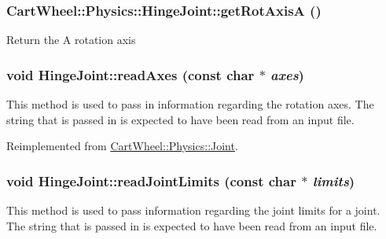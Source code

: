 \hypertarget{classCartWheel_1_1Physics_1_1HingeJoint_a504ac0c55bb16688748fe19e462b0dcf}{
\subsubsection[{getRotAxisA}]{ CartWheel::Physics::HingeJoint::getRotAxisA ()}}
\label{classCartWheel_1_1Physics_1_1HingeJoint_a504ac0c55bb16688748fe19e462b0dcf}
Return the A rotation axis \hypertarget{classCartWheel_1_1Physics_1_1HingeJoint_a03be2b3b0d8b82d646f2c5b343d19faa}{
\subsubsection[{readAxes}]{\setlength{\rightskip}{0pt plus 5cm}void HingeJoint::readAxes (const char $\ast$ {\em axes})}}
\label{classCartWheel_1_1Physics_1_1HingeJoint_a03be2b3b0d8b82d646f2c5b343d19faa}
This method is used to pass in information regarding the rotation axes. The string that is passed in is expected to have been read from an input file. 

Reimplemented from \hyperlink{classCartWheel_1_1Physics_1_1Joint_a30ecfb4d75270a399661552df87c01de}{CartWheel::Physics::Joint}.

\hypertarget{classCartWheel_1_1Physics_1_1HingeJoint_a1e8d5fd7165a0cc0d669775ac95ab53f}{
\subsubsection[{readJointLimits}]{\setlength{\rightskip}{0pt plus 5cm}void HingeJoint::readJointLimits (const char $\ast$ {\em limits})}}
\label{classCartWheel_1_1Physics_1_1HingeJoint_a1e8d5fd7165a0cc0d669775ac95ab53f}
This method is used to pass information regarding the joint limits for a joint. The string that is passed in is expected to have been read from an input file. 

